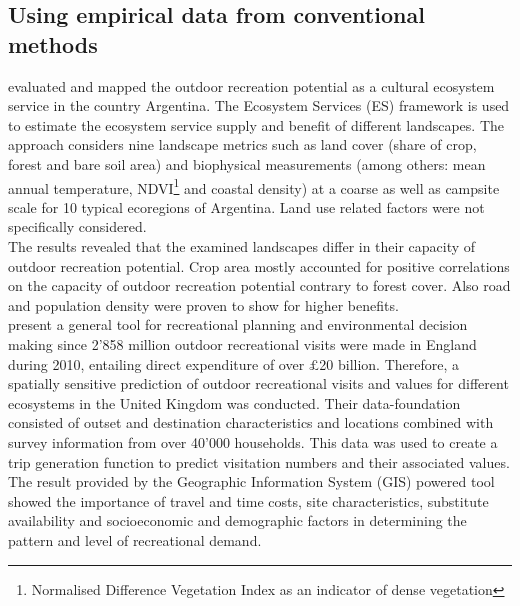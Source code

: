 \subsection{Using empirical data from conventional methods}

\textcite{Weyland2014} evaluated and mapped the outdoor recreation potential as a cultural ecosystem service in the country Argentina. The Ecosystem Services (ES) framework is used to estimate the ecosystem service supply and benefit of different landscapes. The approach considers nine landscape metrics such as land cover (share of crop, forest and bare soil area) and biophysical measurements (among others: mean annual temperature, NDVI\footnote{Normalised Difference Vegetation Index as an indicator of dense vegetation} and coastal density) at a coarse as well as campsite scale for 10 typical ecoregions of Argentina. Land use related factors were not specifically considered. \\
The results revealed that the examined landscapes differ in their capacity of outdoor recreation potential. Crop area mostly accounted for positive correlations on the capacity of outdoor recreation potential contrary to forest cover. Also road and population density were proven to show for higher benefits. \\

\textcite{Sen2014} present a general tool for recreational planning and environmental decision making since 2'858 million outdoor recreational visits were made in England during 2010, entailing direct expenditure of over $£$20 billion. Therefore, a spatially sensitive prediction of outdoor recreational visits and values for different ecosystems in the United Kingdom was conducted. Their data-foundation consisted of outset and destination characteristics and locations combined with survey information from over 40'000 households. This data was used to create a trip generation function to predict visitation numbers and their associated values.\\
The result provided by the Geographic Information System (GIS) powered tool showed the importance of travel and time costs, site characteristics, substitute availability and socioeconomic and demographic factors in determining the pattern and level of recreational demand. \\

